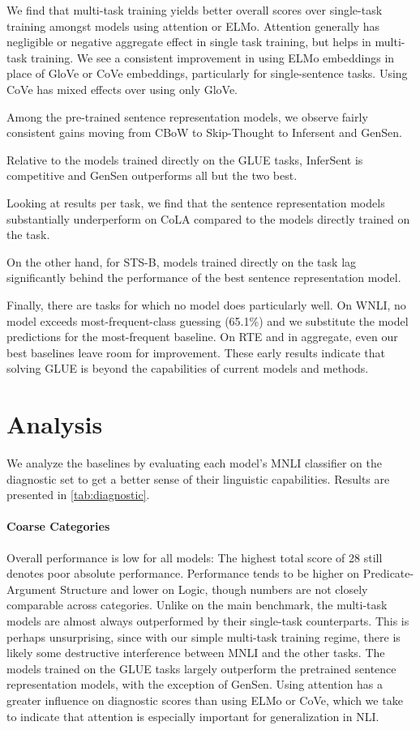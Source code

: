 We find that multi-task training yields better overall scores over single-task training amongst models using attention or ELMo. Attention generally has negligible or negative aggregate effect in single task training, but helps in multi-task training. We see a consistent improvement in using ELMo embeddings in place of GloVe or CoVe embeddings, particularly for single-sentence tasks. Using CoVe has mixed effects over using only GloVe.

Among the pre-trained sentence representation models, we observe fairly consistent gains moving from CBoW to Skip-Thought to Infersent and GenSen.

Relative to the models trained directly on the GLUE tasks, InferSent is competitive and GenSen outperforms all but the two best.

Looking at results per task, we find that the sentence representation models substantially underperform on CoLA compared to the models directly trained on the task. 

On the other hand, for STS-B, models trained directly on the task lag significantly behind the performance of the best sentence representation model.

Finally, there are tasks for which no model does particularly well. On WNLI, no model exceeds most-frequent-class guessing (65.1\%) and we substitute the model predictions for the most-frequent baseline. On RTE and in aggregate, even our best baselines leave room for improvement. These early results indicate that solving GLUE is beyond the capabilities of current models and methods.

\section{Analysis}

We analyze the baselines by evaluating each model's MNLI classifier on the diagnostic set to get a better sense of their linguistic capabilities. Results are presented in \autoref{tab:diagnostic}.

\paragraph{Coarse Categories} Overall performance is low for all models: The highest total score of 28 still denotes poor absolute performance. Performance tends to be higher on Predicate-Argument Structure and lower on Logic, though numbers are not closely comparable across categories. Unlike on the main benchmark, the multi-task models are almost always outperformed by their single-task counterparts. This is perhaps unsurprising, since with our simple multi-task training regime, there is likely some destructive interference between MNLI and the other tasks. The models trained on the GLUE tasks largely outperform the pretrained sentence representation models, with the exception of GenSen. Using attention has a greater influence on diagnostic scores than using ELMo or CoVe, which we take to indicate that attention is especially important for generalization in NLI.

